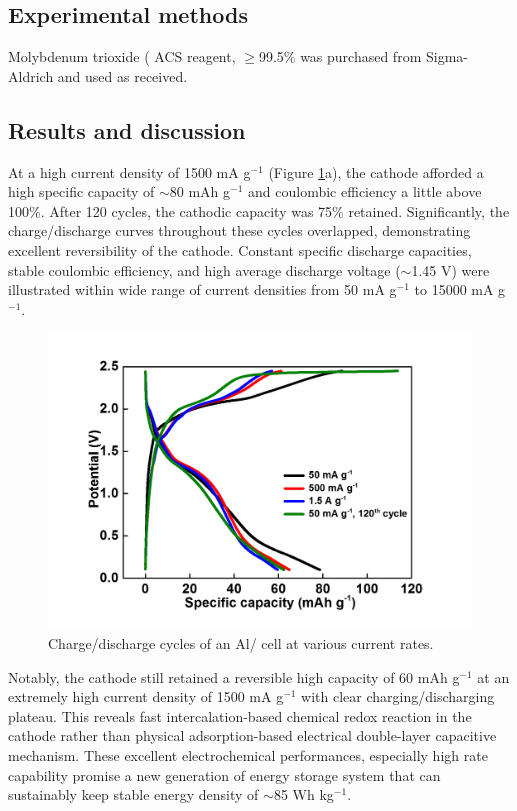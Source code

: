 \subsection{Experimental methods}
Molybdenum trioxide ( ACS reagent, $\geq$99.5\% was purchased from Sigma-Aldrich and used as received.

\subsection{Results and discussion}
At a high current density of 1500 mA g$^{-1}$ (Figure \ref{Figures/chap6fig:MoO3CDC}a), the  cathode afforded a  high specific capacity of $\sim$80 mAh g$^{-1}$ and coulombic efficiency a little above 100\%. After 120 cycles, the cathodic capacity was 75\% retained. Significantly, the charge/discharge curves throughout these cycles overlapped, demonstrating excellent reversibility of the  cathode. Constant specific discharge capacities, stable coulombic efficiency, and high average discharge voltage ($\sim$1.45 V) were illustrated within wide range of current densities from 50 mA g$^{-1}$ to 15000 mA g$^{-1}$. 

\begin{figure}[th!]
\centering
\includegraphics[width=\textwidth]{Figures/chap6fig/MoO3CDCredo}
\caption{Charge/discharge cycles of an Al/ cell at various current rates.}
\label{Figures/chap6fig:MoO3CDC}
\end{figure}

Notably, the cathode still retained a reversible high capacity of 60 mAh g$^{-1}$ at an extremely high current density of 1500 mA g$^{-1}$ with clear charging/discharging plateau. This reveals fast intercalation-based chemical redox reaction in the  cathode rather than physical adsorption-based electrical double-layer capacitive mechanism. These excellent electrochemical performances, especially high rate capability promise a new generation of energy storage system that can sustainably keep stable energy density of $\sim$85 Wh kg$^{-1}$.


